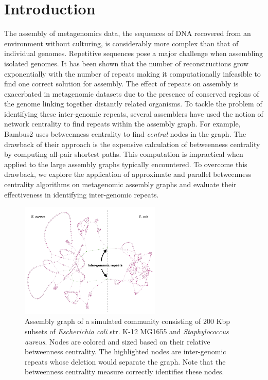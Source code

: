 \documentclass[runningheads,a4paper]{llncs}
\begin{document}
\section{Introduction}

The assembly of metagenomics data, the sequences of DNA recovered from an environment without culturing, is considerably more complex than that of individual genomes.
Repetitive sequences pose a major challenge when assembling isolated genomes.
It has been shown that the number of reconstructions grow exponentially with the number of repeats making it computationally infeasible to find one correct solution for assembly\cite{kingsford}.
The effect of repeats on assembly is exacerbated in metagenomic datasets due to the presence of conserved regions of the genome linking together distantly related organisms.
To tackle the problem of identifying these inter-genomic repeats, several assemblers have used the notion of network centrality to find repeats within the assembly graph.
For example, Bambus2\cite{bambus} uses betweenness centrality to find \emph{central} nodes in the graph.
The drawback of their approach is the expensive calculation of betweenness centrality by computing all-pair shortest paths.
This computation is impractical when applied to the large assembly graphs typically encountered.
To overcome this drawback, we explore the application of approximate and parallel betweenness centrality algorithms on metagenomic assembly graphs and evaluate their effectiveness in identifying inter-genomic repeats.

\begin{figure}[htbp]
\centering
\includegraphics[width=0.60\textwidth]{es_mix_200kb_k21.png}
\caption{Assembly graph of a simulated community consisting of 200 Kbp subsets of \textit{Escherichia coli} str. K-12 MG1655 and \textit{Staphylococcus aureus}.  Nodes are colored and sized based on their relative betweenness centrality. The highlighted nodes are inter-genomic repeats whose deletion would separate the graph. Note that the betweenness centrality measure correctly identifies these nodes.}
\label{fig:sampled_nodes}
\end{figure}
\end{document}
